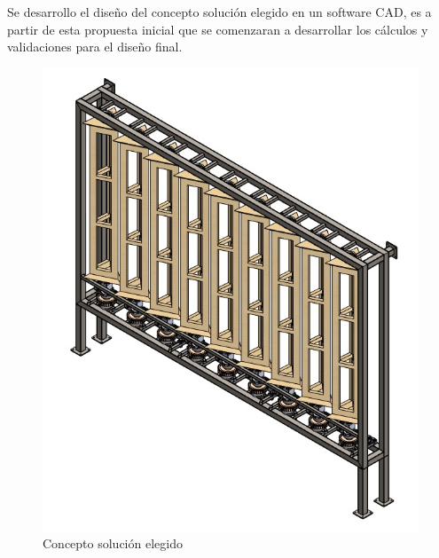 Se desarrollo el diseño del concepto solución elegido en un software CAD, es a partir de esta propuesta inicial que se comenzaran a desarrollar los cálculos y validaciones para el diseño final.
\begin{figure}[!htb]
    \centering
    \includegraphics[width=1\textwidth]{imagenes/ConceptoSolucion.jpg}
    \caption{\footnotesize Concepto solución elegido}
    \label{fig:ConceptoSolucionElegido}
\end{figure}
\FloatBarrier

